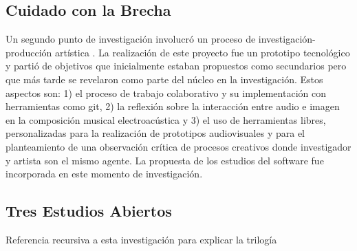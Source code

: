 \subsection{Cuidado con la Brecha}

Un segundo punto de investigación involucró un proceso de investigación-producción artística \citep{ocelotlMas}. La realización de este proyecto fue un prototipo tecnológico y partió de objetivos que inicialmente estaban propuestos como secundarios pero que más tarde se revelaron como parte del núcleo en la investigación. Estos aspectos son: 1) el proceso de trabajo colaborativo y su implementación con herramientas como git, 2) la reflexión sobre la interacción entre audio e imagen en la composición musical electroacústica y 3) el uso de herramientas libres, personalizadas para la realización de prototipos audiovisuales y para el planteamiento de una observación crítica de procesos creativos donde investigador y artista son el mismo agente. La propuesta de los estudios del software fue incorporada en este momento de investigación. 

\subsection{Tres Estudios Abiertos}

Referencia recursiva a esta investigación para explicar la trilogía

